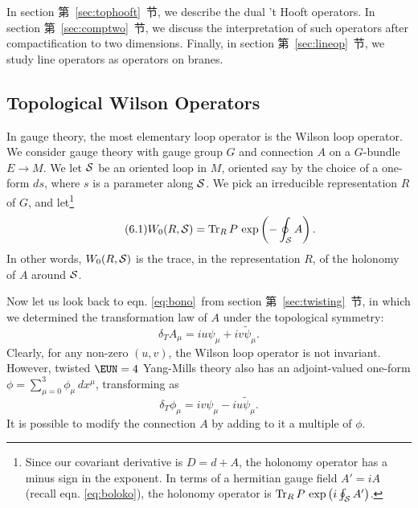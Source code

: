 In section 第~\ref{sec:tophooft}~节, we describe the dual 't Hooft  operators. In
section 第~\ref{sec:comptwo}~节, we discuss the interpretation of such operators
after compactification to two dimensions. Finally, in section
第~\ref{sec:lineop}~节, we study line operators as operators on branes.

\subsection{Topological Wilson Operators}

\label{sec:topwil}

In gauge theory, the most elementary loop operator is the Wilson
loop operator.  We consider gauge theory with gauge group $G$ and
connection $A$ on a $G$-bundle $E\to M$. We let ${\cal S}$ be an
oriented loop in $M$, oriented say by the choice of a one-form
$ds$, where $s$ is a parameter along ${\cal S}$.  We pick an
irreducible representation $R$ of $G$, and let\footnote{Since our
covariant derivative is $D=d+A$, the holonomy operator has a minus
sign in the exponent.  In terms of a hermitian gauge field $A'=iA$
(recall eqn. \eqref{eq:boloko}), the holonomy operator is ${\rm
Tr}_R\,P\,\exp\left(i\oint_{\cal S} A'\right)$.}
\begin{equation*}
\tag*{(6.1)}
W_0(R,{{\cal S}})={\rm Tr}_R
\,P\,\exp\left(-\oint_{{\cal S}} A\right).
\end{equation*}
 In other words,
$W_0(R,{\cal S})$ is the trace, in the representation $R$, of the
holonomy of $A$ around ${\cal S}$.

Now let us look back to eqn. \eqref{eq:bono}\ from section 第~\ref{sec:twisting}~节, in
which we determined the transformation law of $A$ under the
topological symmetry: %
\setcounter{equation}{1}
\begin{equation}\label{eq:likp}
\delta_T
A_\mu=iu\psi_\mu+iv\tilde\psi_\mu.
\end{equation}
 Clearly, for any non-zero
$(u,v)$, the Wilson loop operator is not invariant.  However,
twisted ${\EUN}=4$ Yang-Mills theory also has an adjoint-valued
one-form $\phi=\sum_{\mu=0}^3\phi_\mu\,dx^\mu$, transforming as
\setcounter{equation}{2}
\begin{equation}\label{eq:nikp}
\delta_T\phi_\mu=iv\psi_\mu-iu\tilde\psi_\mu.
\end{equation}
 It is
possible to modify the connection $A$ by adding to it a multiple
of $\phi$.

